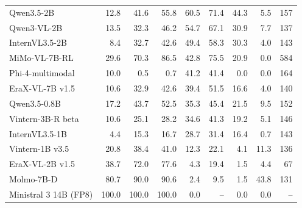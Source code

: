 \begin{table}[t]
\begin{tabular}{lrrrrrrrr}
Qwen3.5-2B & 12.8 & 41.6 & 55.8 & 60.5 & 71.4 & 44.3 & 5.5 & 157 \\
Qwen3-VL-2B & 13.5 & 32.3 & 46.2 & 54.7 & 67.1 & 30.9 & 7.7 & 137 \\
InternVL3.5-2B & 8.4 & 32.7 & 42.6 & 49.4 & 58.3 & 30.3 & 4.0 & 143 \\
MiMo-VL-7B-RL & 29.6 & 70.3 & 86.5 & 42.8 & 75.5 & 20.9 & 0.0 & 584 \\
Phi-4-multimodal & 10.0 & 0.5 & 0.7 & 41.2 & 41.4 & 0.0 & 0.0 & 164 \\
EraX-VL-7B v1.5 & 10.6 & 32.9 & 42.6 & 39.4 & 51.5 & 16.6 & 4.0 & 140 \\
Qwen3.5-0.8B & 17.2 & 43.7 & 52.5 & 35.3 & 45.4 & 21.5 & 9.5 & 152 \\
Vintern-3B-R beta & 10.6 & 25.1 & 28.2 & 34.6 & 41.3 & 19.2 & 5.1 & 146 \\
InternVL3.5-1B & 4.4 & 15.3 & 16.7 & 28.7 & 31.4 & 16.4 & 0.7 & 143 \\
Vintern-1B v3.5 & 20.8 & 38.4 & 41.0 & 12.3 & 22.1 & 4.1 & 11.3 & 136 \\
EraX-VL-2B v1.5 & 38.7 & 72.0 & 77.6 & 4.3 & 19.4 & 1.5 & 4.4 & 67 \\
Molmo-7B-D & 80.7 & 90.0 & 90.6 & 2.4 & 9.5 & 1.5 & 43.8 & 131 \\
Ministral 3 14B (FP8) & 100.0 & 100.0 & 100.0 & 0.0 & – & 0.0 & 0.0 & – \\
\bottomrule
\end{tabular}
\par{}
\end{table}
